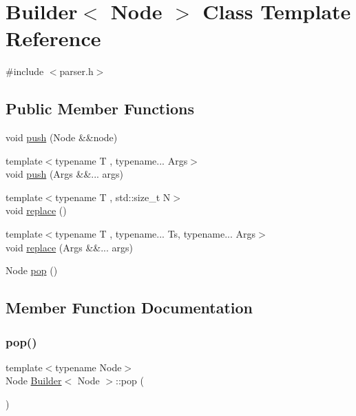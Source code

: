 \hypertarget{class_builder}{}\section{Builder$<$ Node $>$ Class Template Reference}
\label{class_builder}


{\ttfamily \#include $<$parser.\+h$>$}

\subsection*{Public Member Functions}
\begin{DoxyCompactItemize}
\item 
void \hyperlink{class_builder_ab5d5a9c74592ca913ecc7f75cc85c264}{push} (Node \&\&node)
\item 
{\footnotesize template$<$typename T , typename... Args$>$ }\\void \hyperlink{class_builder_a8dee6cb8313b1e43dfbb90fa22fdd66a}{push} (Args \&\&... args)
\item 
{\footnotesize template$<$typename T , std\+::size\+\_\+t N$>$ }\\void \hyperlink{class_builder_a3b8f593df382e865b087d72355a4b5b2}{replace} ()
\item 
{\footnotesize template$<$typename T , typename... Ts, typename... Args$>$ }\\void \hyperlink{class_builder_afa2c034e8301d162be0aa796188c56f8}{replace} (Args \&\&... args)
\item 
Node \hyperlink{class_builder_afbe8f0a6362c14485533dcf331d681e6}{pop} ()
\end{DoxyCompactItemize}


\subsection{Member Function Documentation}
\mbox{\label{class_builder_afbe8f0a6362c14485533dcf331d681e6}} 
\subsubsection{\texorpdfstring{pop()}{pop()}}
{\footnotesize\ttfamily template$<$typename Node$>$ \\
Node \hyperlink{class_builder}{Builder}$<$ Node $>$\+::pop (\begin{DoxyParamCaption}{ }\end{DoxyParamCaption})\hspace{0.3cm}{\ttfamily [inline]}}

